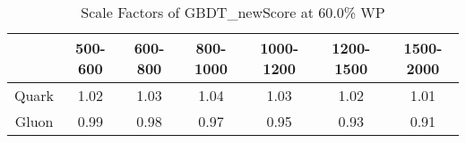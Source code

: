 \begin{table}
\centering
\caption{Scale Factors of GBDT_newScore at 60.0\% WP}
\label{tab:GBDT_newScore_0.6_Gluon}
\begin{tabular}{ccccccc}
\toprule
{} &  500-600 &  600-800 &  800-1000 &  1000-1200 &  1200-1500 &  1500-2000 \\
\midrule
Quark &     1.02 &     1.03 &      1.04 &       1.03 &       1.02 &       1.01 \\
Gluon &     0.99 &     0.98 &      0.97 &       0.95 &       0.93 &       0.91 \\
\bottomrule
\end{tabular}
\end{table}
